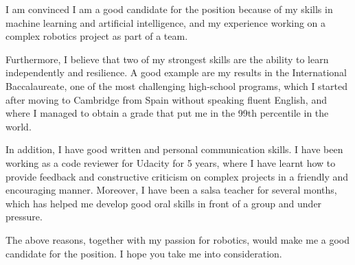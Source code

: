 \documentclass[11pt, a4paper]{awesome-cv}
\begin{document}
\begin{cvletter}

I am convinced I am a good candidate for the position because of my skills in machine learning and artificial intelligence, and my experience working on a complex robotics project as part of a team. 

Furthermore, I believe that two of my strongest skills are the ability to learn independently and resilience. A good example are my results in the International Baccalaureate, one of the most challenging high-school programs, which I started after moving to Cambridge from Spain without speaking fluent English, and where I managed to obtain a grade that put me in the 99th percentile in the world.

In addition, I have good written and personal communication skills. I have been working as a code reviewer for Udacity for 5 years, where I have learnt how to provide feedback and constructive criticism on complex projects in a friendly and encouraging manner. Moreover, I have been a salsa teacher for several months, which has helped me develop good oral skills in front of a group and under pressure. 

The above reasons, together with my passion for robotics, would make me a good candidate for the position. I hope you take me into consideration. 

\end{cvletter}


\makeletterclosing
\end{document}
